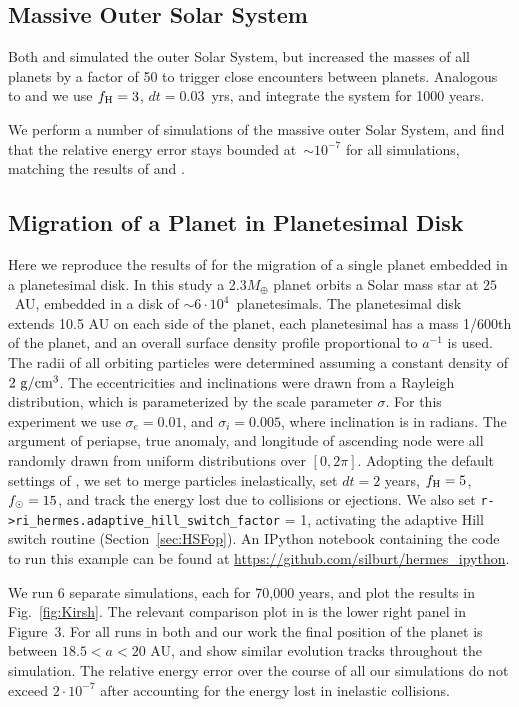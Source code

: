 \subsection{Massive Outer Solar System}
Both \citet{Duncan1998} and \citet{Chambers1999} simulated the outer Solar System, but increased the masses of all planets by a factor of 50 to trigger close encounters between planets.
Analogous to \citet{Chambers1999} and \citet{Duncan1998} we use $f_{\rm H}=3$, $dt= 0.03$~yrs, and integrate the system for 1000 years. 

We perform a number of simulations of the massive outer Solar System, and find that the relative energy error stays bounded at~$\sim 10^{-7}$ for all simulations, matching the results of \citet{Chambers1999} and \citet{Duncan1998}. 

\subsection{Migration of a Planet in Planetesimal Disk \citep{Kirsh2009} }
Here we reproduce the results of \citet{Kirsh2009} for the migration of a single planet embedded in a planetesimal disk. 
In this study a 2.3$M_{\oplus}$ planet orbits a Solar mass star at $25$~AU, embedded in a disk of $\sim6\cdot10^4$~planetesimals. 
The planetesimal disk extends 10.5 AU on each side of the planet, each planetesimal has a mass 1/600th of the planet, and an overall surface density profile proportional to $a^{-1}$ is used.
The radii of all orbiting particles were determined assuming a constant density of $2~\rm{ g/cm^3}$.
The eccentricities and inclinations were drawn from a Rayleigh distribution, which is parameterized by the scale parameter $\sigma$.
For this experiment we use $\sigma_e = 0.01$, and $\sigma_i = 0.005$, where inclination is in radians.
The argument of periapse, true anomaly, and longitude of ascending node were all randomly drawn from uniform distributions over $[0, 2\pi]$.
Adopting the default settings of \citet{Kirsh2009}, we set \hermes to merge particles inelastically, set $dt=2$ years, $f_{\rm H} = 5$, $f_{\rm \odot} = 15$, and track the energy lost due to collisions or ejections. 
We also set {\sc \tt r->ri\_hermes.adaptive\_hill\_switch\_factor} = 1, activating the adaptive Hill switch routine (Section~\ref{sec:HSFop}).
An IPython notebook containing the code to run this example can be found at \url{https://github.com/silburt/hermes_ipython}.

We run 6 separate simulations, each for 70,000 years, and plot the results in Fig.~\ref{fig:Kirsh}.
The relevant comparison plot in \citet{Kirsh2009} is the lower right panel in Figure~3.
For all runs in both \citet{Kirsh2009} and our work the final position of the planet is between $18.5 < a < 20$ AU, and show similar evolution tracks throughout the simulation. 
The relative energy error over the course of all our simulations do not exceed $2\cdot10^{-7}$ after accounting for the energy lost in inelastic collisions. 

